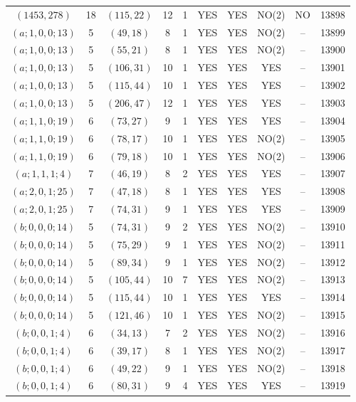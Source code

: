 \begin{longtable}{|c|c|c|c|c|c|c|c|c|c|}
$(1453, 278)$ & 18 & $(115, 22)$ & 12 & 1 & YES & YES & NO(2) & NO & 13898\\
$(a; 1, 0, 0; 13)$ & 5 & $(49, 18)$ & 8 & 1 & YES & YES & NO(2) & -- & 13899\\
$(a; 1, 0, 0; 13)$ & 5 & $(55, 21)$ & 8 & 1 & YES & YES & NO(2) & -- & 13900\\
$(a; 1, 0, 0; 13)$ & 5 & $(106, 31)$ & 10 & 1 & YES & YES & YES & -- & 13901\\
$(a; 1, 0, 0; 13)$ & 5 & $(115, 44)$ & 10 & 1 & YES & YES & YES & -- & 13902\\
$(a; 1, 0, 0; 13)$ & 5 & $(206, 47)$ & 12 & 1 & YES & YES & YES & -- & 13903\\
$(a; 1, 1, 0; 19)$ & 6 & $(73, 27)$ & 9 & 1 & YES & YES & YES & -- & 13904\\
$(a; 1, 1, 0; 19)$ & 6 & $(78, 17)$ & 10 & 1 & YES & YES & NO(2) & -- & 13905\\
$(a; 1, 1, 0; 19)$ & 6 & $(79, 18)$ & 10 & 1 & YES & YES & NO(2) & -- & 13906\\
$(a; 1, 1, 1; 4)$ & 7 & $(46, 19)$ & 8 & 2 & YES & YES & YES & -- & 13907\\
$(a; 2, 0, 1; 25)$ & 7 & $(47, 18)$ & 8 & 1 & YES & YES & YES & -- & 13908\\
$(a; 2, 0, 1; 25)$ & 7 & $(74, 31)$ & 9 & 1 & YES & YES & YES & -- & 13909\\
$(b; 0, 0, 0; 14)$ & 5 & $(74, 31)$ & 9 & 2 & YES & YES & NO(2) & -- & 13910\\
$(b; 0, 0, 0; 14)$ & 5 & $(75, 29)$ & 9 & 1 & YES & YES & NO(2) & -- & 13911\\
$(b; 0, 0, 0; 14)$ & 5 & $(89, 34)$ & 9 & 1 & YES & YES & NO(2) & -- & 13912\\
$(b; 0, 0, 0; 14)$ & 5 & $(105, 44)$ & 10 & 7 & YES & YES & NO(2) & -- & 13913\\
$(b; 0, 0, 0; 14)$ & 5 & $(115, 44)$ & 10 & 1 & YES & YES & YES & -- & 13914\\
$(b; 0, 0, 0; 14)$ & 5 & $(121, 46)$ & 10 & 1 & YES & YES & NO(2) & -- & 13915\\
$(b; 0, 0, 1; 4)$ & 6 & $(34, 13)$ & 7 & 2 & YES & YES & NO(2) & -- & 13916\\
$(b; 0, 0, 1; 4)$ & 6 & $(39, 17)$ & 8 & 1 & YES & YES & NO(2) & -- & 13917\\
$(b; 0, 0, 1; 4)$ & 6 & $(49, 22)$ & 9 & 1 & YES & YES & NO(2) & -- & 13918\\
$(b; 0, 0, 1; 4)$ & 6 & $(80, 31)$ & 9 & 4 & YES & YES & YES & -- & 13919\\

\end{longtable}

